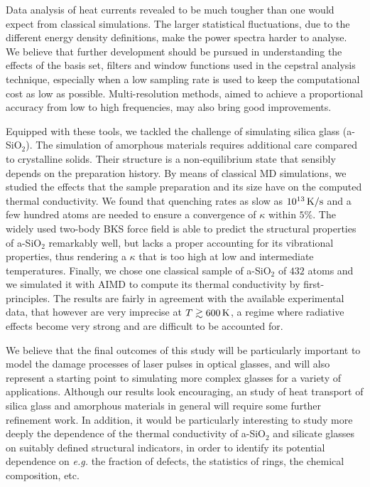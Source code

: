 Data analysis of \abinitio heat currents revealed to be much tougher than one would expect from classical simulations. The larger statistical fluctuations, due to the different energy density definitions, make the power spectra harder to analyse. 
We believe that further development should be pursued in understanding the effects of the basis set, filters and window functions used in the cepstral analysis technique, especially when a low sampling rate is used to keep the computational cost as low as possible. 
Multi-resolution methods, aimed to achieve a proportional accuracy from low to high frequencies, may also bring good improvements. 

\smallskip
Equipped with these tools, we tackled the challenge of simulating silica glass (a-SiO$_2$). 
The simulation of amorphous materials requires additional care compared to crystalline solids. Their structure is a non-equilibrium state that sensibly depends on the preparation history. 
By means of classical MD simulations, we studied the effects that the sample preparation and its size have on the computed thermal conductivity. We found that quenching rates as slow as $10^{13}\,\mathrm{K/s}$ and a few hundred atoms are needed to ensure a convergence of $\kappa$ within $5\%$. 
The widely used two-body BKS force field is able to predict the structural properties of a-SiO$_2$ remarkably well, but lacks a proper accounting for its vibrational properties, thus rendering a $\kappa$ that is too high at low and intermediate temperatures. 
Finally, we chose one classical sample of a-SiO$_2$ of $432$ atoms and we simulated it with AIMD to compute its thermal conductivity by first-principles. 
The results are fairly in agreement with the available experimental data, that however are very imprecise at $T \gtrsim 600\,\mathrm{K}$, a regime where radiative effects become very strong and are difficult to be accounted for. 

We believe that the final outcomes of this study will be particularly important to model the damage processes of laser pulses in optical glasses, and will also represent a starting point to simulating more complex glasses for a variety of applications. 
Although our results look encouraging, an \abinitio study of heat transport of silica glass and amorphous materials in general will require some further refinement work. 
In addition, it would be particularly interesting to study more deeply the dependence of the thermal conductivity of a-SiO$_2$ and silicate glasses on suitably defined structural indicators, in order to identify its potential dependence on \emph{e.g.} the fraction of defects, the statistics of rings, the chemical composition, etc.

